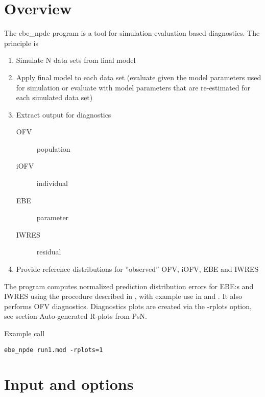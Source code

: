 



\maketitle
\newcommand{\guidetoolname}{ebe\_npde}


\section{Overview}

The ebe\_npde program is a tool for simulation-evaluation based diagnostics.
The principle is 
\begin{enumerate}
\item Simulate N data sets from final model
\item Apply final model to each data set (evaluate given the model parameters used for simulation or evaluate with model parameters that are re-estimated for each simulated data set)
\item Extract output for diagnostics
\begin{description}
\item[OFV] population
\item[iOFV] individual
\item[EBE] parameter
\item[IWRES] residual
\end{description}
\item Provide reference distributions for ”observed” OFV, iOFV, EBE and IWRES
\end{enumerate}
The program computes normalized prediction distribution errors for EBE:s and IWRES 
using the procedure described in \cite{Comets}, with example use in \cite{Keizer} and \cite{Largajolli}.
It also performs OFV diagnostics. Diagnostics plots are created via the -rplots option, see section 
Auto-generated R-plots from PsN.

Example call
\begin{verbatim}
ebe_npde run1.mod -rplots=1
\end{verbatim}

\section{Input and options}

